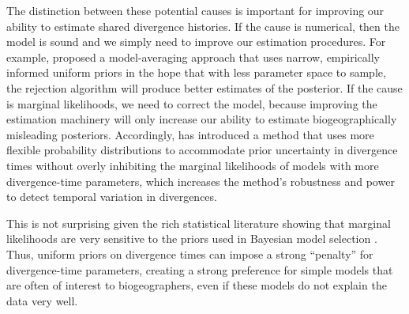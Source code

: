 The distinction between these potential causes is important for improving our
ability to estimate shared divergence histories.
If the cause is numerical, then the model is sound and we simply need to
improve our estimation procedures.
For example, \citet{Hickerson2013} proposed a model-averaging approach that
uses narrow, empirically informed uniform priors in the hope that with less
parameter space to sample, the rejection algorithm will produce better
estimates of the posterior.
If the cause is marginal likelihoods, we need to correct the model, because
improving the estimation machinery will only increase our ability to estimate
biogeographically misleading posteriors.
Accordingly, \citet{Oaks2014dpp} has introduced a method that uses more
flexible probability distributions to accommodate prior uncertainty in
divergence times without overly inhibiting the marginal likelihoods of models
with more divergence-time parameters, which increases the method's robustness
and power to detect temporal variation in divergences.

This is not surprising given the rich statistical literature showing that
marginal likelihoods are very sensitive to the priors used in Bayesian model
selection \citep[e.g.,][]{Jeffreys1939,Lindley1957}.
Thus, uniform priors on divergence times can impose a strong ``penalty'' for
divergence-time parameters, creating a strong preference for simple
models that are often of interest to biogeographers, even if these models do
not explain the data very well.

